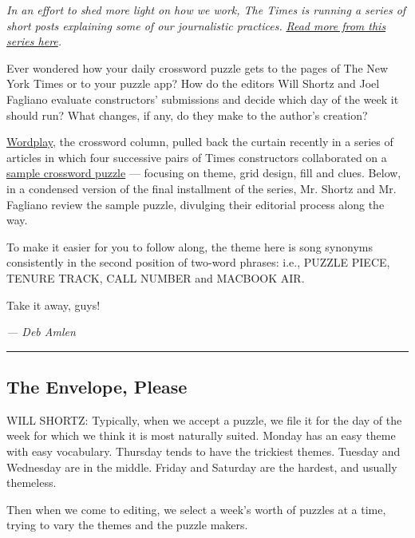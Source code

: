 \emph{In an effort to shed more light on how we work, The Times is
running a series of short posts explaining some of our journalistic
practices.}
\href{https://www.nytimes3xbfgragh.onion/series/understanding-the-times?module=inline}{\emph{Read
more from this series here}}\emph{.}

Ever wondered how your daily crossword puzzle gets to the pages of The
New York Times or to your puzzle app? How do the editors Will Shortz and
Joel Fagliano evaluate constructors' submissions and decide which day of
the week it should run? What changes, if any, do they make to the
author's creation?

\href{https://www.nytimes3xbfgragh.onion/2018/09/14/crosswords/how-to-make-a-crossword-puzzle-the-series.html}{Wordplay},
the crossword column, pulled back the curtain recently in a series of
articles in which four successive pairs of Times constructors
collaborated on a
\href{https://static01.graylady3jvrrxbe.onion/packages/other/crossword/HTMAC.pdf}{sample
crossword puzzle} --- focusing on theme, grid design, fill and clues.
Below, in a condensed version of the final installment of the series,
Mr. Shortz and Mr. Fagliano review the sample puzzle, divulging their
editorial process along the way.

To make it easier for you to follow along, the theme here is song
synonyms consistently in the second position of two-word phrases: i.e.,
PUZZLE PIECE, TENURE TRACK, CALL NUMBER and MACBOOK AIR.

Take it away, guys!

\emph{--- Deb Amlen}

\begin{center}\rule{0.5\linewidth}{\linethickness}\end{center}

\hypertarget{the-envelope-please}{%
\subsection{The Envelope, Please}\label{the-envelope-please}}

WILL SHORTZ: Typically, when we accept a puzzle, we file it for the day
of the week for which we think it is most naturally suited. Monday has
an easy theme with easy vocabulary. Thursday tends to have the trickiest
themes. Tuesday and Wednesday are in the middle. Friday and Saturday are
the hardest, and usually themeless.

Then when we come to editing, we select a week's worth of puzzles at a
time, trying to vary the themes and the puzzle makers.

